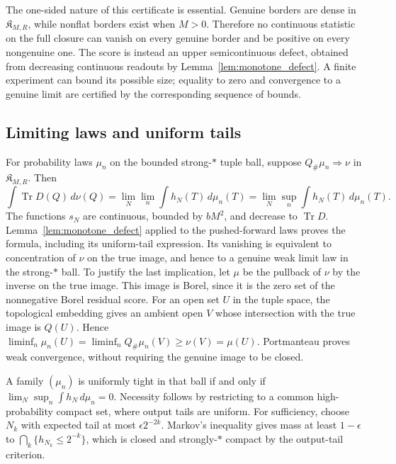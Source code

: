 \documentclass[11pt,a4paper]{amsart}
\numberwithin{equation}{section}
\theoremstyle{definition}
\theoremstyle{remark}
\DeclareMathOperator{\Tr}{Tr}
\begin{document}
The one-sided nature of this certificate is essential. Genuine borders are dense in $\mathfrak K_{M,R}$, while nonflat borders exist when $M>0$. Therefore no continuous statistic on the full closure can vanish on every genuine border and be positive on every nongenuine one. The score is instead an upper semicontinuous defect, obtained from decreasing continuous readouts by Lemma~\ref{lem:monotone_defect}. A finite experiment can bound its possible size; equality to zero and convergence to a genuine limit are certified by the corresponding sequence of bounds.

\subsection{Limiting laws and uniform tails}

For probability laws $\mu_n$ on the bounded strong-$*$ tuple ball, suppose $Q_\#\mu_n\Rightarrow\nu$ in $\mathfrak K_{M,R}$. Then
\begin{equation}\label{eq:lawescape}
 \int\Tr D(Q)\,d\nu(Q)
 =\lim_N\lim_n\int h_N(T)\,d\mu_n(T)
 =\lim_N\sup_n\int h_N(T)\,d\mu_n(T).
\end{equation}
The functions $s_N$ are continuous, bounded by $bM^2$, and decrease to $\Tr D$. Lemma~\ref{lem:monotone_defect} applied to the pushed-forward laws proves the formula, including its uniform-tail expression. Its vanishing is equivalent to concentration of $\nu$ on the true image, and hence to a genuine weak limit law in the strong-$*$ ball. To justify the last implication, let $\mu$ be the pullback of $\nu$ by the inverse on the true image. This image is Borel, since it is the zero set of the nonnegative Borel residual score. For an open set $U$ in the tuple space, the topological embedding gives an ambient open $V$ whose intersection with the true image is $Q(U)$. Hence $\liminf_n\mu_n(U)=\liminf_nQ_\#\mu_n(V)\ge\nu(V)=\mu(U)$. Portmanteau proves weak convergence, without requiring the genuine image to be closed.

A family $(\mu_n)$ is uniformly tight in that ball if and only if
$\lim_N\sup_n\int h_N\,d\mu_n=0$.
Necessity follows by restricting to a common high-probability compact set, where output tails are uniform. For sufficiency, choose $N_k$ with expected tail at most $\epsilon2^{-2k}$. Markov's inequality gives mass at least $1-\epsilon$ to
$\bigcap_k\{h_{N_k}\le2^{-k}\}$,
which is closed and strongly-$*$ compact by the output-tail criterion.
\end{document}

